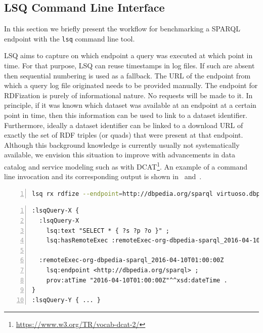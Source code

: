 
\subsection{LSQ Command Line Interface}
In this section we briefly present the workflow for benchmarking a SPARQL endpoint with the
\texttt{lsq} command line tool.


LSQ aims to capture on which endpoint a query was executed at which point in time.
For that purpose, LSQ can reuse timestamps in log files. If such are absent then sequential numbering is used as a fallback. The URL of the endpoint from which a query log file originated needs to be provided manually.
The endpoint for RDFization is purely of informational nature. No requests will be made to it. In principle, if it was known which dataset was available at an endpoint at a certain point in time, then this information can be used to link to a dataset identifier. Furthermore, ideally a dataset identifier can be linked to a download URL of exactly the set of RDF triples (or quads) that were present at that endpoint. Although this background knowledge is currently usually not systematically available, we envision this situation to improve with advancements in data catalog and service modeling such as with DCAT\footnote{\url{https://www.w3.org/TR/vocab-dcat-2/}}.
An example of a command line invocation and its corresponding output is shown in~ and~.
\begin{lstlisting}[label=lst:lsq-rdfize, caption={Command for rdfizing a SPARQL query log}, style=lst, language=bash, numbers=left]
lsq rx rdfize --endpoint=http://dbpedia.org/sparql virtuoso.dbpedia.log 
\end{lstlisting}

\begin{lstlisting}[label=lst:lsq-rdfize-output, caption={The output of the rdfization is one named graph per query}, style=lst, language=ttl, numbers=left]
:lsqQuery-X {
  :lsqQuery-X
    lsq:text "SELECT * { ?s ?p ?o }" ;
    lsq:hasRemoteExec :remoteExec-org-dbpedia-sparql_2016-04-10T01:00:00Z .

  :remoteExec-org-dbpedia-sparql_2016-04-10T01:00:00Z
    lsq:endpoint <http://dbpedia.org/sparql> ;
    prov:atTime "2016-04-10T01:00:00Z"^^xsd:dateTime .
}
:lsqQuery-Y { ... }
\end{lstlisting}

